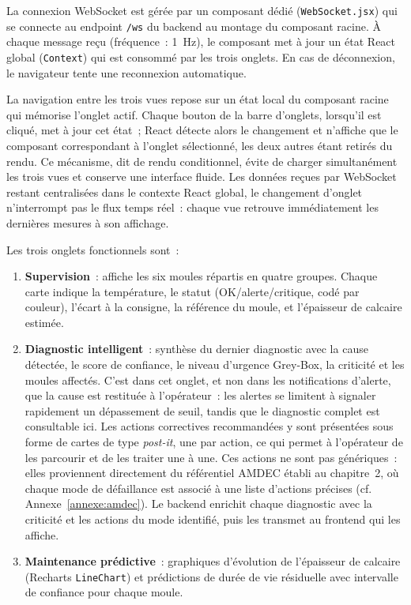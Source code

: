 La connexion WebSocket est gérée par un composant dédié (\texttt{WebSocket.jsx}) qui se connecte au endpoint \texttt{/ws} du backend au montage du composant racine. À chaque message reçu (fréquence~: 1~Hz), le composant met à jour un état React global (\texttt{Context}) qui est consommé par les trois onglets. En cas de déconnexion, le navigateur tente une reconnexion automatique.

La navigation entre les trois vues repose sur un état local du composant racine qui mémorise l'onglet actif. Chaque bouton de la barre d'onglets, lorsqu'il est cliqué, met à jour cet état~; React détecte alors le changement et n'affiche que le composant correspondant à l'onglet sélectionné, les deux autres étant retirés du rendu. Ce mécanisme, dit de rendu conditionnel, évite de charger simultanément les trois vues et conserve une interface fluide. Les données reçues par WebSocket restant centralisées dans le contexte React global, le changement d'onglet n'interrompt pas le flux temps réel~: chaque vue retrouve immédiatement les dernières mesures à son affichage.

Les trois onglets fonctionnels sont~:

\begin{enumerate}
  \item \textbf{Supervision}~: affiche les six moules répartis en quatre groupes. Chaque carte indique la température, le statut (OK/alerte/critique, codé par couleur), l'écart à la consigne, la référence du moule, et l'épaisseur de calcaire estimée.
  \item \textbf{Diagnostic intelligent}~: synthèse du dernier diagnostic avec la cause détectée, le score de confiance, le niveau d'urgence Grey-Box, la criticité et les moules affectés. C'est dans cet onglet, et non dans les notifications d'alerte, que la cause est restituée à l'opérateur~: les alertes se limitent à signaler rapidement un dépassement de seuil, tandis que le diagnostic complet est consultable ici. Les actions correctives recommandées y sont présentées sous forme de cartes de type \emph{post-it}, une par action, ce qui permet à l'opérateur de les parcourir et de les traiter une à une. Ces actions ne sont pas génériques~: elles proviennent directement du référentiel AMDEC établi au chapitre~2, où chaque mode de défaillance est associé à une liste d'actions précises (cf. Annexe~\ref{annexe:amdec}). Le backend enrichit chaque diagnostic avec la criticité et les actions du mode identifié, puis les transmet au frontend qui les affiche.
  \item \textbf{Maintenance prédictive}~: graphiques d'évolution de l'épaisseur de calcaire (Recharts \texttt{LineChart}) et prédictions de durée de vie résiduelle avec intervalle de confiance pour chaque moule.
\end{enumerate}

